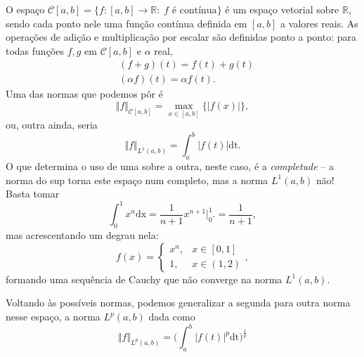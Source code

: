 \documentclass[../functional_analysis.tex]{subfiles}
\begin{document}
\begin{example}
	O espaço \(\mathcal{C}[a, b] = \{f:[a, b]\rightarrow \mathbb{R}:\; f \text{ é contínua}\}\) é um espaço vetorial sobre \(\mathbb{R}\), sendo cada ponto nele uma função contínua definida em \([a, b]\) a valores reais. As operações de adição e multiplicação por escalar são definidas ponto a ponto: para todas funções \(f, g\) em \(\mathcal{C}[a, b]\) e \(\alpha \) real,
	\begin{align*}
		 & (f+g)(t) = f(t) + g(t)       \\
		 & (\alpha f)(t) = \alpha f(t).
	\end{align*}
	Uma das normas que podemos pôr é
	\[
		\Vert f \Vert_{\mathcal{C}[a, b]} = \max\limits_{x\in [a, b]}\{|f(x)|\},
	\]
	ou, outra ainda, seria
	\[
		\Vert f \Vert_{L^{1}(a, b)} = \int_{a}^{b}|f(t)| \mathrm{dt}.
	\]
	O que determina o uso de uma sobre a outra, neste caso, é a \textit{completude} -- a norma do sup torna este espaço num completo, mas a norma \(L^{1}(a, b)\) não! Basta tomar
	\[
		\int_{0}^{1}x^{n} \mathrm{dx}= \frac{1}{n+1}x^{n+1}\biggl|_{0}^{1}\biggr. = \frac{1}{n+1},
	\]
	mas acrescentando um degrau nela:
	\[
		f(x) = \left\{\begin{array}{ll}
			x^{n}, & x\in [0, 1] \\
			1,     & x\in (1, 2)
		\end{array}\right.,
	\]
	formando uma sequência de Cauchy que não converge na norma \(L^{1}(a, b)\).

	Voltando às possíveis normas, podemos generalizar a segunda para outra norma nesse espaço, a norma \(L^{p}(a, b)\) dada como
	\[
		\Vert f \Vert_{L^{p}(a, b)} = \biggl(\int_{a}^{b}|f(t)|^{p} \mathrm{dt}\biggr)^{\frac{1}{p}}
	\]
\end{example}
\end{document}
